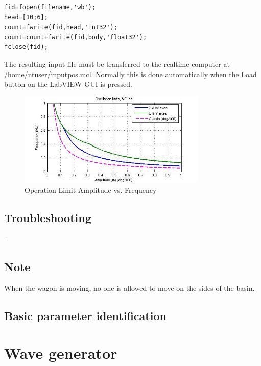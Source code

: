 \documentclass[a4paper,twoside,english]{report}
\begin{document}
\begin{verbatim}
fid=fopen(filename,'wb');
head=[10;6];
count=fwrite(fid,head,'int32');
count=count+fwrite(fid,body,'float32');
fclose(fid); 
\end{verbatim}

The resulting input file must be transferred to the realtime computer
at /home/ntuser/inputpos.mcl. Normally this is done automatically
when the Load button on the LabVIEW GUI is pressed. 

\begin{figure}
\centering \includegraphics[width=0.8\textwidth]{fig/towing_ampvsfreq}
\caption{\label{fig: Towing main-1-1}Operation Limit Amplitude vs. Frequency}
\end{figure}

\newpage{}

\section{Troubleshooting}

-

\section{Note}

When the wagon is moving, no one is allowed to move on the sides of
the basin.

\clearpage{}

\section{Basic parameter identification}


\clearpage{}

\chapter{Wave generator}
\end{document}
